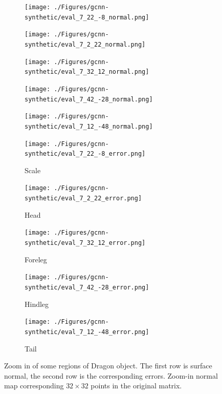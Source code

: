 \documentclass[border=15pt, multi, tikz]{article}
\begin{document}
\begin{figure}[H]
	\centering
	\begin{subfigure}[b]{0.18\linewidth}
		\texttt{[image: ./Figures/gcnn-synthetic/eval\_7\_22\_-8\_normal.png]}
	\end{subfigure}
	\begin{subfigure}[b]{0.18\linewidth}
		\texttt{[image: ./Figures/gcnn-synthetic/eval\_7\_2\_22\_normal.png]}
	\end{subfigure}
	\begin{subfigure}[b]{0.18\linewidth}
		\texttt{[image: ./Figures/gcnn-synthetic/eval\_7\_32\_12\_normal.png]}
	\end{subfigure}
	\begin{subfigure}[b]{0.18\linewidth}
		\texttt{[image: ./Figures/gcnn-synthetic/eval\_7\_42\_-28\_normal.png]}
	\end{subfigure}
	\begin{subfigure}[b]{0.18\linewidth}
		\texttt{[image: ./Figures/gcnn-synthetic/eval\_7\_12\_-48\_normal.png]}
	\end{subfigure}
	
	\begin{subfigure}[b]{0.18\linewidth}
		\texttt{[image: ./Figures/gcnn-synthetic/eval\_7\_22\_-8\_error.png]}
		\caption{Scale}
	\end{subfigure}
	\begin{subfigure}[b]{0.18\linewidth}
		\texttt{[image: ./Figures/gcnn-synthetic/eval\_7\_2\_22\_error.png]}
		\caption{Head}
	\end{subfigure}
	\begin{subfigure}[b]{0.18\linewidth}
		\texttt{[image: ./Figures/gcnn-synthetic/eval\_7\_32\_12\_error.png]}
		\caption{Foreleg}
	\end{subfigure}
	\begin{subfigure}[b]{0.18\linewidth}
		\texttt{[image: ./Figures/gcnn-synthetic/eval\_7\_42\_-28\_error.png]}
		\caption{Hindleg}
	\end{subfigure}
	\begin{subfigure}[b]{0.18\linewidth}
		\texttt{[image: ./Figures/gcnn-synthetic/eval\_7\_12\_-48\_error.png]}
		\caption{Tail}
	\end{subfigure}
	
	
	\caption{Zoom in of some regions of Dragon object. The first row is surface normal, the second row is the corresponding errors. Zoom-in normal map corresponding $ 32\times32 $ points in the original matrix.}
	\label{fig:gcnn-eval-synthetic-zoom-in}
\end{figure}
\end{document}
